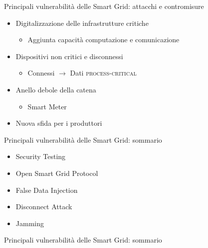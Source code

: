 

\begin{frame}{Principali vulnerabilità delle Smart Grid: attacchi e contromisure}
	\begin{itemize}[<+- | alert@+>]
		\item Digitalizzazione delle infrastrutture critiche
		\begin{itemize}
			\item Aggiunta capacità computazione e comunicazione
		\end{itemize}
		\item Dispositivi non critici e disconnessi
		\begin{itemize}
			\item Connessi $\rightarrow$ Dati \textsc{process-critical}
		\end{itemize}
		\item Anello debole della catena
		\begin{itemize}
			\item Smart Meter
		\end{itemize}
		\item Nuova sfida per i produttori
	\end{itemize}
\end{frame}

\begin{frame}{Principali vulnerabilità delle Smart Grid: sommario}
	\begin{itemize}
		\item Security Testing
		\item Open Smart Grid Protocol
		\item False Data Injection
		\item Disconnect Attack
		\item Jamming
	\end{itemize}
\end{frame}

\begin{frame}{Principali vulnerabilità delle Smart Grid: sommario}
\end{frame}

